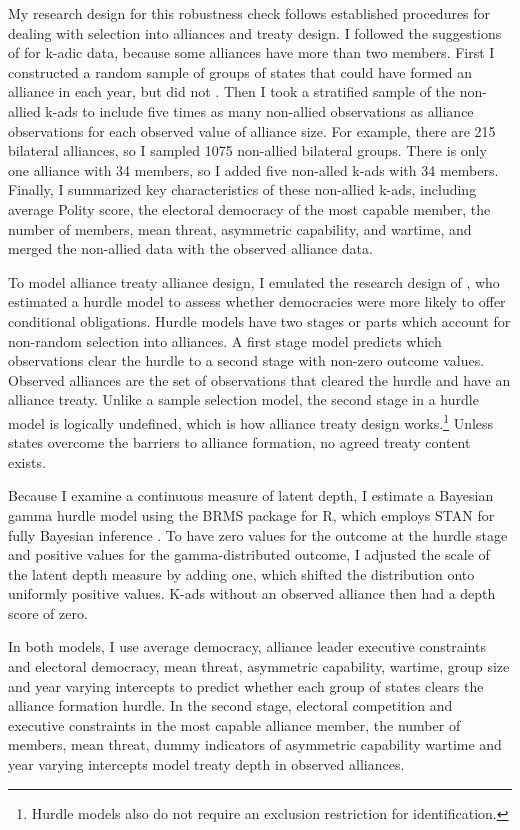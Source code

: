 \documentclass[12pt]{article}
\begin{document}
My research design for this robustness check follows established procedures for dealing with selection into alliances and treaty design. 
I followed the suggestions of \citet{Poast2010} for k-adic data, because some alliances have more than two members. 
First I constructed a random sample of groups of states that could have formed an alliance in each year, but did not \citep{FordhamPoast2014}.
Then I took a stratified sample of the non-allied k-ads to include five times as many non-allied observations as alliance observations for each observed value of alliance size. 
For example, there are 215 bilateral alliances, so I sampled 1075 non-allied bilateral groups. 
There is only one alliance with 34 members, so I added five non-alled k-ads with 34 members. 
Finally, I summarized key characteristics of these non-allied k-ads, including average Polity score, the electoral democracy of the most capable member, the number of members, mean threat, asymmetric capability, and wartime, and merged the non-allied data with the observed alliance data. 


To model alliance treaty alliance design, I emulated the research design of \citet{Chibaetal2015}, who estimated a hurdle model to assess whether democracies were more likely to offer conditional obligations.
Hurdle models have two stages or parts which account for non-random selection into alliances.
A first stage model predicts which observations clear the hurdle to a second stage with non-zero outcome values. 
Observed alliances are the set of observations that cleared the hurdle and have an alliance treaty. 
Unlike a sample selection model, the second stage in a hurdle model is logically undefined, which is how alliance treaty design works.\footnote{Hurdle models also do not require an exclusion restriction for identification.} 
Unless states overcome the barriers to alliance formation, no agreed treaty content exists. 


Because I examine a continuous measure of latent depth, I estimate a Bayesian gamma hurdle model using the BRMS package for \textsf{R}, which employs STAN for fully Bayesian inference \citep{Buerkner2017}.
To have zero values for the outcome at the hurdle stage and positive values for the gamma-distributed outcome, I adjusted the scale of the latent depth measure by adding one, which shifted the distribution onto uniformly positive values. 
K-ads without an observed alliance then had a depth score of zero. 


In both models, I use average democracy, alliance leader executive constraints and electoral democracy, mean threat, asymmetric capability, wartime, group size and year varying intercepts to predict whether each group of states clears the alliance formation hurdle.
In the second stage, electoral competition and executive constraints in the most capable alliance member, the number of members, mean threat, dummy indicators of asymmetric capability wartime and year varying intercepts model treaty depth in observed alliances. 
\end{document}
